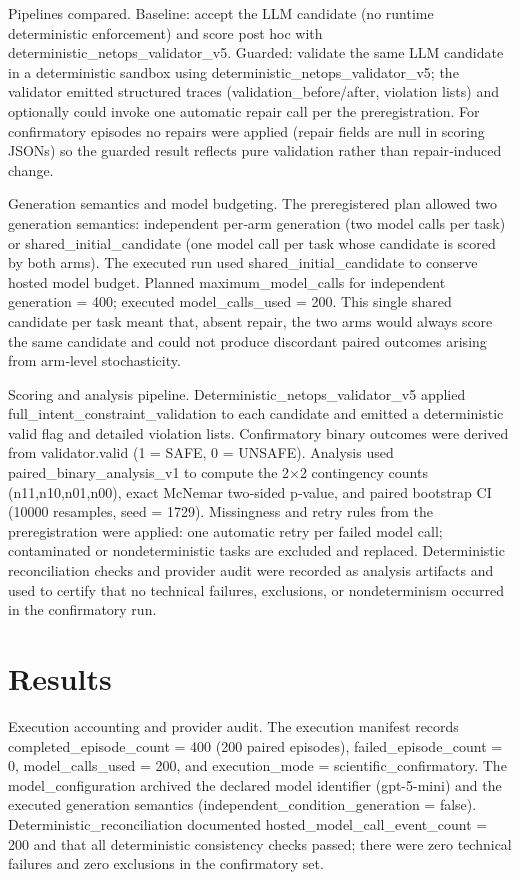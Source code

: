 \documentclass[conference]{IEEEtran}
\begin{document}
Pipelines compared. Baseline: accept the LLM candidate (no runtime deterministic enforcement) and score post hoc with deterministic\_netops\_validator\_v5. Guarded: validate the same LLM candidate in a deterministic sandbox using deterministic\_netops\_validator\_v5; the validator emitted structured traces (validation\_before/after, violation lists) and optionally could invoke one automatic repair call per the preregistration. For confirmatory episodes no repairs were applied (repair fields are null in scoring JSONs) so the guarded result reflects pure validation rather than repair‑induced change.

Generation semantics and model budgeting. The preregistered plan allowed two generation semantics: independent per‑arm generation (two model calls per task) or shared\_initial\_candidate (one model call per task whose candidate is scored by both arms). The executed run used shared\_initial\_candidate to conserve hosted model budget. Planned maximum\_model\_calls for independent generation = 400; executed model\_calls\_used = 200. This single shared candidate per task meant that, absent repair, the two arms would always score the same candidate and could not produce discordant paired outcomes arising from arm‑level stochasticity.

Scoring and analysis pipeline. Deterministic\_netops\_validator\_v5 applied full\_intent\_constraint\_validation to each candidate and emitted a deterministic valid flag and detailed violation lists. Confirmatory binary outcomes were derived from validator.valid (1 = SAFE, 0 = UNSAFE). Analysis used paired\_binary\_analysis\_v1 to compute the 2\ensuremath{\times}2 contingency counts (n11,n10,n01,n00), exact McNemar two‑sided p‑value, and paired bootstrap CI (10000 resamples, seed = 1729). Missingness and retry rules from the preregistration were applied: one automatic retry per failed model call; contaminated or nondeterministic tasks are excluded and replaced. Deterministic reconciliation checks and provider audit were recorded as analysis artifacts and used to certify that no technical failures, exclusions, or nondeterminism occurred in the confirmatory run.

\section{Results}
Execution accounting and provider audit. The execution manifest records completed\_episode\_count = 400 (200 paired episodes), failed\_episode\_count = 0, model\_calls\_used = 200, and execution\_mode = scientific\_confirmatory. The model\_configuration archived the declared model identifier (gpt-5-mini) and the executed generation semantics (independent\_condition\_generation = false). Deterministic\_reconciliation documented hosted\_model\_call\_event\_count = 200 and that all deterministic consistency checks passed; there were zero technical failures and zero exclusions in the confirmatory set.
\end{document}
